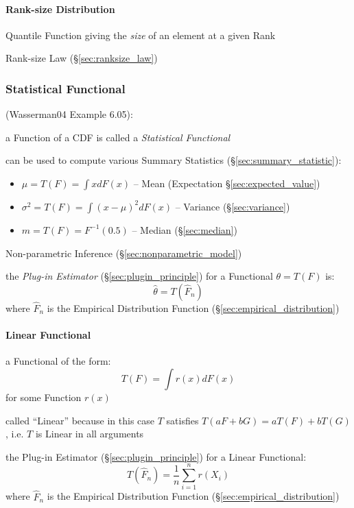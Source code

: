 \paragraph{Rank-size Distribution}\label{sec:rank_size}\hfill

Quantile Function giving the \emph{size} of an element at a given Rank

\fist Rank-size Law (\S\ref{sec:ranksize_law})



\subsubsection{Statistical Functional}\label{sec:statistical_functional}

(Wasserman04 Example 6.05):

a Function of a CDF is called a \emph{Statistical Functional}

can be used to compute various Summary Statistics
(\S\ref{sec:summary_statistic}):
\begin{itemize}
  \item $\mu = T(F) = \int x dF(x)$
    -- Mean (Expectation \S\ref{sec:expected_value})
  \item $\sigma^2 = T(F) = \int (x - \mu)^2 dF(x)$
    -- Variance (\S\ref{sec:variance})
  \item $m = T(F) = F^{-1}(0.5)$
    -- Median (\S\ref{sec:median})
\end{itemize}

Non-parametric Inference (\S\ref{sec:nonparametric_model})

the \emph{Plug-in Estimator} (\S\ref{sec:plugin_principle}) for a Functional
$\theta = T(F)$ is:
\[
  \hat{\theta} = T(\hat{F}_n)
\]
where $\hat{F}_n$ is the Empirical Distribution Function
(\S\ref{sec:empirical_distribution})



\paragraph{Linear Functional}\label{sec:linear_functional}\hfill

a Functional of the form:
\[
  T(F) = \int r(x) dF(x)
\]
for some Function $r(x)$

called ``Linear'' because in this case $T$ satisfies
$T(aF + bG) = aT(F) + bT(G)$, i.e. $T$ is Linear in all arguments

the Plug-in Estimator (\S\ref{sec:plugin_principle}) for a Linear Functional:
\[
  T(\hat{F}_n) = \frac{1}{n}\sum_{i=1}^n r(X_i)
\]
where $\hat{F}_n$ is the Empirical Distribution Function
(\S\ref{sec:empirical_distribution})



